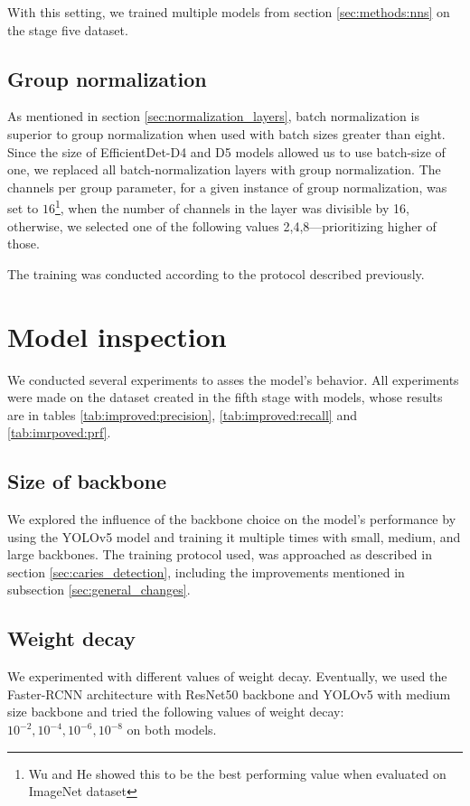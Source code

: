 With this setting, we trained multiple models from section \ref{sec:methods:nns} on the stage five dataset.

\subsection{Group normalization}
As mentioned in section \ref{sec:normalization_layers}, batch normalization is superior to group normalization when used with batch sizes greater than eight. Since the size of EfficientDet-D4 and D5  models allowed us to use batch-size of one, we replaced all batch-normalization layers with group normalization. The channels per group parameter, for a given instance of group normalization, was set to $16$\footnote{Wu and He \cite{Wu2018} showed this to be the best performing value when evaluated on ImageNet dataset}, when the number of channels in the layer was divisible by 16, otherwise, we selected one of the following values 2,4,8—prioritizing higher of those.

The training was conducted according to the protocol described previously.


\section{Model inspection}
\label{sec:model_inspection}
We conducted several experiments to asses the model's behavior. All experiments were made on the dataset created in the fifth stage with models, whose results are in tables \ref{tab:improved:precision}, \ref{tab:improved:recall} and \ref{tab:imrpoved:prf}.

\subsection{Size of backbone}
We explored the influence of the backbone choice on the model's performance by using the YOLOv5 model and training it multiple times with small, medium, and large backbones. The training protocol used,  was approached as described in section \ref{sec:caries_detection}, including the improvements mentioned in subsection \ref{sec:general_changes}.

\subsection{Weight decay}
We experimented with different values of weight decay. Eventually, we used the Faster-RCNN architecture with ResNet50 backbone and YOLOv5 with medium size backbone and tried the following values of weight decay: $10^{-2}, 10^{-4}, 10^{-6}, 10^{-8}$ on both models.


